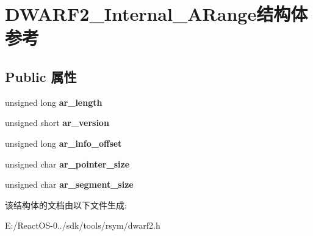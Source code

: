 \hypertarget{struct_d_w_a_r_f2___internal___a_range}{}\section{D\+W\+A\+R\+F2\+\_\+\+Internal\+\_\+\+A\+Range结构体 参考}
\label{struct_d_w_a_r_f2___internal___a_range}
\subsection*{Public 属性}
\begin{DoxyCompactItemize}
\item 
\mbox{\label{struct_d_w_a_r_f2___internal___a_range_af2d4a90b1bf2dfcc02a559ffb8e84206}} 
unsigned long {\bfseries ar\+\_\+length}
\item 
\mbox{\label{struct_d_w_a_r_f2___internal___a_range_a22514be1e03bda743a3b09672143aaed}} 
unsigned short {\bfseries ar\+\_\+version}
\item 
\mbox{\label{struct_d_w_a_r_f2___internal___a_range_a85f7a098beb6ed9969be3085db098b64}} 
unsigned long {\bfseries ar\+\_\+info\+\_\+offset}
\item 
\mbox{\label{struct_d_w_a_r_f2___internal___a_range_a7eb402af5744dd6f98345c9747b91316}} 
unsigned char {\bfseries ar\+\_\+pointer\+\_\+size}
\item 
\mbox{\label{struct_d_w_a_r_f2___internal___a_range_a5c41f9baf816b4cabc0e8c52534b86cb}} 
unsigned char {\bfseries ar\+\_\+segment\+\_\+size}
\end{DoxyCompactItemize}


该结构体的文档由以下文件生成\+:\begin{DoxyCompactItemize}
\item 
E\+:/\+React\+O\+S-\/0../sdk/tools/rsym/dwarf2.\+h\end{DoxyCompactItemize}
